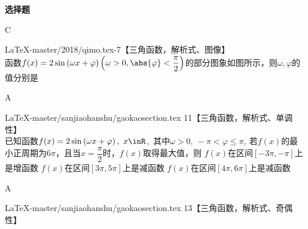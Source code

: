 \begin{exercise}{\bf 选择题}
\begin{answer}
        C
      \end{answer}
    \item LaTeX-master/2018/qimo.tex-7【三角函数，解析式、图像】\\
      函数$f(x)=2\sin\left(\omega x+\varphi\right)\left(\omega>0,\abs{\varphi}<\dfrac{\pi}{2}\right)$的部分图象如图所示，则$ \omega,\varphi $的值分别是\xz
      \begin{minipage}[b]{0.7\linewidth}
        \vspace{1.5cm}
      \end{minipage}\hfill
      \begin{minipage}[h]{0.3\linewidth}
        \vspace{-1cm}
      \end{minipage}
      \begin{answer}
        A
      \end{answer}
    \item LaTeX-master/sanjiaohanshu/gaokaosection.tex 11【三角函数，解析式、单调性】\\
      已知函数$f(x)=2\sin \left(\omega x+\varphi\right),\ x \inR$,\ 其中$ \omega>0,\ -\pi <\varphi\le \pi ,\  $若$f(x)$的最小正周期为$ 6\pi  $，且当$ x=\dfrac{\pi}{2} $时，$f(x)$取得最大值，则\xz
        {$f(x)$在区间$ \left[-3\pi,-\pi \right] $上是增函数}
        {$f(x)$在区间$ \left[3\pi,5\pi \right] $上是减函数}
        {$f(x)$在区间$ \left[4\pi,6\pi \right] $上是减函数}
      \begin{answer}
        A
      \end{answer}
    \item LaTeX-master/sanjiaohanshu/gaokaosection.tex 13【三角函数，解析式、奇偶性】\\

\end{exercise}
